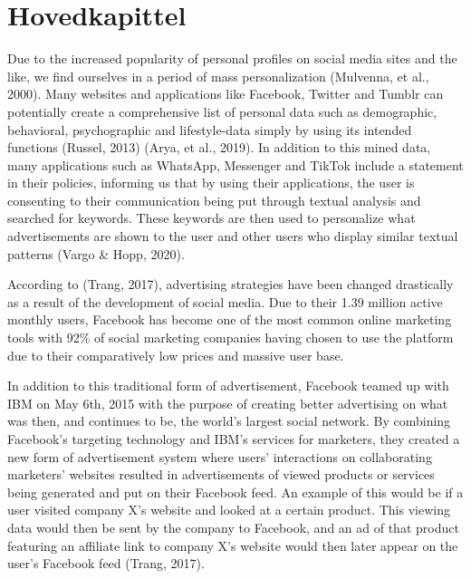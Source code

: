 \documentclass[11pt]{article}
\begin{document}
\section{Hovedkapittel}


Due to the increased popularity of personal profiles on social media sites and the like, we find ourselves in a period of mass personalization (Mulvenna, et al., 2000). Many websites and applications like Facebook, Twitter and Tumblr can potentially create a comprehensive list of personal data such as demographic, behavioral, psychographic and lifestyle-data simply by using its intended functions (Russel, 2013) (Arya, et al., 2019). In addition to this mined data, many applications such as WhatsApp, Messenger and TikTok include a statement in their policies, informing us that by using their applications, the user is consenting to their communication being put through textual analysis and searched for keywords. These keywords are then used to personalize what advertisements are shown to the user and other users who display similar textual patterns (Vargo \& Hopp, 2020). 

According to (Trang, 2017), advertising strategies have been changed drastically as a result of the development of social media. Due to their 1.39 million active monthly users, Facebook has become one of the most common online marketing tools with 92\% of social marketing companies having chosen to use the platform due to their comparatively low prices and massive user base.  

In addition to this traditional form of advertisement, Facebook teamed up with IBM on May 6th, 2015 with the purpose of creating better advertising on what was then, and continues to be, the world’s largest social network. By combining Facebook’s targeting technology and IBM’s services for marketers, they created a new form of advertisement system where users’ interactions on collaborating marketers’ websites resulted in advertisements of viewed products or services being generated and put on their Facebook feed. An example of this would be if a user visited company X’s website and looked at a certain product. This viewing data would then be sent by the company to Facebook, and an ad of that product featuring an affiliate link to company X’s website would then later appear on the user’s Facebook feed (Trang, 2017).  
\end{document}
